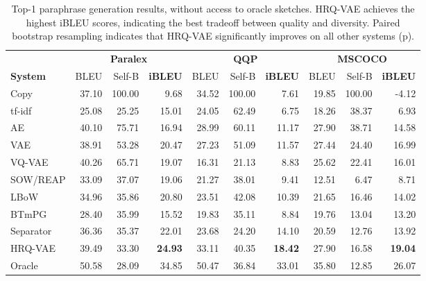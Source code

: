 \documentclass[11pt]{article}
\begin{document}
\begin{table*}[ht!]
    \centering
\small
\begin{tabular}{l|rrr|rrr|rrr}
& \multicolumn{3}{c|}{\textbf{Paralex}} & \multicolumn{3}{c|}{\textbf{QQP}} & \multicolumn{3}{c}{\textbf{MSCOCO}} \\
    \textbf{System} & {BLEU}  & {Self-B}   & {\textbf{iBLEU}}   & {BLEU}   & {Self-B}  & {\textbf{iBLEU}}  & {BLEU}   & {Self-B}  & {\textbf{iBLEU}}  \\
\hline \hline
    Copy  & 37.10 & 100.00 & 9.68 & 34.52 & 100.00 & 7.61 & 19.85 & 100.00 & -4.12 \\ 
    \mbox{tf-idf}  & 25.08 & 25.25 & 15.01 & 24.05 & 62.49 & 6.75 & 18.26 & 38.37 & 6.93 \\ 
    AE  & 40.10 & 75.71 & 16.94 & 28.99 & 60.11 & 11.17 & 27.90 &  38.71 & 14.58 \\ 
    VAE  & 38.91 & 53.28 & 20.47 & 27.23 & 51.09 & 11.57 & 27.44 & 24.40 & 16.99 \\ 
    

    VQ-VAE  & 40.26 & 65.71 & 19.07 & 16.31 & 21.13 & 8.83 & 25.62 & 22.41 & 16.01 \\ 
    \hline
SOW/REAP & 33.09 & 37.07 & 19.06 & 21.27 & 38.01 & 9.41 & 12.51 & 6.47 & 8.71 \\ 
    LBoW & 34.96 & 35.86 & 20.80 & 23.51 & 42.08 & 10.39 & 21.65 & 16.46 & 14.02 \\ 
    BTmPG & 28.40 & 35.99 & 15.52 & 19.83 & 35.11 & 8.84 & 19.76 & 13.04 & 13.20 \\

    Separator & 36.36 & 35.37 & 22.01 & 23.68 & 24.20 & 14.10 & 20.59 & 12.76 & 13.92  \\
HRQ-VAE & 39.49 & 33.30 & \textbf{24.93} & 33.11 & 40.35 & \textbf{18.42} &  27.90 & 16.58 & \textbf{19.04}  \\
    \hline 
{Oracle} & 50.58 & 28.09 & 34.85 & 50.47 & 36.84 & 33.01 & 35.80 & 12.85 & 26.07 \\
    
    
    
    \hline \hline
    \end{tabular}
\caption{Top-1 paraphrase generation results, without access to oracle
      sketches. HRQ-VAE achieves the highest iBLEU scores, indicating the best tradeoff between quality and diversity. Paired bootstrap resampling \cite{koehn-2004-statistical} indicates that HRQ-VAE significantly improves on all other systems (p).}  
\label{tab:ibleu}
\end{table*}
\end{document}
